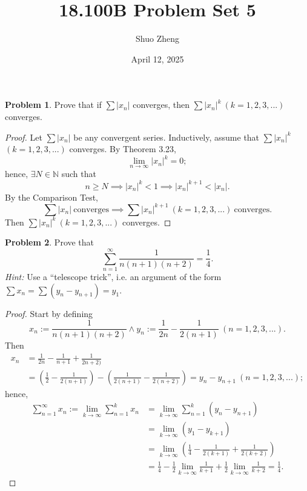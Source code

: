 \documentclass{amsart}
\title{18.100B Problem Set 5}
\author{Shuo Zheng}
\date{April 12, 2025}
\theoremstyle{definition}
\newtheorem{problem}{Problem}
\begin{document}
\maketitle

\begin{problem}
    Prove that if $\sum \vert x_n \vert$ converges, then $\sum \vert x_n \vert^k \ (k = 1,2,3,...)$ converges.
\end{problem}

\begin{proof}
    Let $\sum \vert x_n \vert$ be any convergent series. Inductively, assume that $\sum \vert x_n \vert^k$ $(k = 1,2,3,...)$ converges. By Theorem 3.23, 
    \[
    \lim_{n \to \infty} \vert x_n \vert^k = 0;
    \]
    hence, $\exists N \in \mathbb{N}$ such that 
    \[
    n \geq N \implies \vert x_n \vert^k < 1 \implies \vert x_n \vert^{k+1} < \vert x_n \vert. 
    \]
    By the Comparison Test, 
    \[
    \sum \vert x_n \vert \ \text{converges} \implies \sum \vert x_n \vert^{k+1} \ (k = 1,2,3,...) \ \text{converges}.
    \]
    Then $\sum \vert x_n \vert^k \ (k = 1,2,3,...)$ converges. 
\end{proof}

\begin{problem}
    Prove that
    \[
    \sum_{n=1}^{\infty}\frac{1}{n(n+1)(n+2)} = \frac{1}{4}.
    \]
    \textit{Hint:} Use a “telescope trick”, i.e. an argument of the form $\sum x_n = \sum (y_n - y_{n+1}) = y_1$.
\end{problem}

\begin{proof}
    Start by defining
    \[
    x_n := \frac{1}{n(n+1)(n+2)} \land y_n := \frac{1}{2n} - \frac{1}{2(n+1)} \ (n = 1,2,3,...). 
    \]
    Then 
    \begin{align*}
        x_n &= \frac{1}{2n} - \frac{1}{n+1} + \frac{1}{2n+2)} \\
        &= \left(\frac{1}{2} - \frac{1}{2(n+1)}\right) - \left(\frac{1}{2(n+1)} - \frac{1}{2(n+2)}\right) = y_n - y_{n+1} \ (n = 1,2,3,...);
    \end{align*}
    hence,
    \begin{align*}
        \sum_{n=1}^{\infty} x_n := \lim_{k \to \infty}\sum_{n=1}^{k}x_n &= \lim_{k \to \infty}\sum_{n=1}^{k}(y_n-y_{n+1}) \\
        &= \lim_{k \to \infty}(y_1 - y_{k+1}) \\
        &= \lim_{k \to \infty}\left(\frac{1}{4} - \frac{1}{2(k+1)} + \frac{1}{2(k+2)}\right) \\
        &= \frac{1}{4} - \frac{1}{2}\lim_{k \to \infty}\frac{1}{k+1} + \frac{1}{2}\lim_{k \to \infty}\frac{1}{k+2} = \frac{1}{4}.
    \end{align*}
\end{proof}
\end{document}
